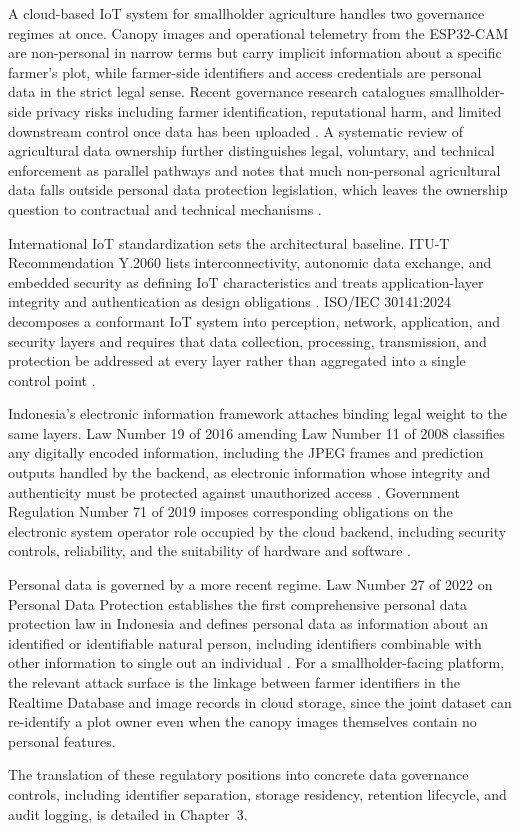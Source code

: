 A cloud-based IoT system for smallholder agriculture handles two governance regimes at once. Canopy images and operational telemetry from the ESP32-CAM are non-personal in narrow terms but carry implicit information about a specific farmer's plot, while farmer-side identifiers and access credentials are personal data in the strict legal sense. Recent governance research catalogues smallholder-side privacy risks including farmer identification, reputational harm, and limited downstream control once data has been uploaded \cite{kaur2022farmerprivacy}. A systematic review of agricultural data ownership further distinguishes legal, voluntary, and technical enforcement as parallel pathways and notes that much non-personal agricultural data falls outside personal data protection legislation, which leaves the ownership question to contractual and technical mechanisms \cite{berisha2026dataownership}.

International IoT standardization sets the architectural baseline. ITU-T Recommendation Y.2060 lists interconnectivity, autonomic data exchange, and embedded security as defining IoT characteristics and treats application-layer integrity and authentication as design obligations \cite{itut_y2060}. ISO/IEC 30141:2024 decomposes a conformant IoT system into perception, network, application, and security layers and requires that data collection, processing, transmission, and protection be addressed at every layer rather than aggregated into a single control point \cite{iso30141_2024}.

Indonesia's electronic information framework attaches binding legal weight to the same layers. Law Number 19 of 2016 amending Law Number 11 of 2008 classifies any digitally encoded information, including the JPEG frames and prediction outputs handled by the backend, as electronic information whose integrity and authenticity must be protected against unauthorized access \cite{uuite2016}. Government Regulation Number 71 of 2019 imposes corresponding obligations on the electronic system operator role occupied by the cloud backend, including security controls, reliability, and the suitability of hardware and software \cite{pp71_2019}.

Personal data is governed by a more recent regime. Law Number 27 of 2022 on Personal Data Protection establishes the first comprehensive personal data protection law in Indonesia and defines personal data as information about an identified or identifiable natural person, including identifiers combinable with other information to single out an individual \cite{uupdp2022}. For a smallholder-facing platform, the relevant attack surface is the linkage between farmer identifiers in the Realtime Database and image records in cloud storage, since the joint dataset can re-identify a plot owner even when the canopy images themselves contain no personal features.

The translation of these regulatory positions into concrete data governance controls, including identifier separation, storage residency, retention lifecycle, and audit logging, is detailed in Chapter~3.
